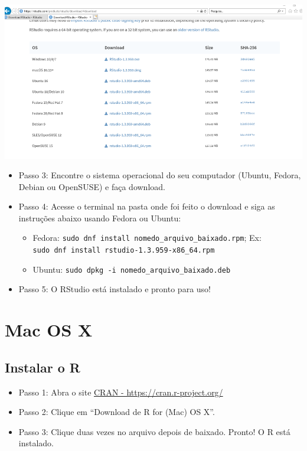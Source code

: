 \documentclass[
  10pt,
  brazil,
  a4paper,
  twoside, notitlepage, openright]{book}
\providecommand{\tightlist}{%
  \setlength{\itemsep}{0pt}\setlength{\parskip}{0pt}}
\begin{document}
\includegraphics[width=13.54in]{img/inst_1_rstudio}

\begin{itemize}
\tightlist
\item
  Passo 3: Encontre o sistema operacional do seu computador (Ubuntu, Fedora, Debian ou OpenSUSE) e faça download.\\
\item
  Passo 4: Acesse o terminal na pasta onde foi feito o download e siga as instruções abaixo usando Fedora ou Ubuntu:

  \begin{itemize}
  \tightlist
  \item
    Fedora: \texttt{sudo\ dnf\ install\ nomedo\_arquivo\_baixado.rpm}; Ex: \texttt{sudo\ dnf\ install\ rstudio-1.3.959-x86\_64.rpm}
  \item
    Ubuntu: \texttt{sudo\ dpkg\ -i\ nomedo\_arquivo\_baixado.deb}\\
  \end{itemize}
\item
  Passo 5: O RStudio está instalado e pronto para uso!
\end{itemize}

\hypertarget{mac-os-x}{%
\section{Mac OS X}\label{mac-os-x}}

\hypertarget{instalar-o-r-1}{%
\subsection{Instalar o R}\label{instalar-o-r-1}}

\begin{itemize}
\tightlist
\item
  Passo 1: Abra o site \href{https://cran.r-project.org/}{CRAN - https://cran.r-project.org/}
\item
  Passo 2: Clique em ``Download de R for (Mac) OS X''.\\
\item
  Passo 3: Clique duas vezes no arquivo depois de baixado. Pronto! O R está instalado.
\end{itemize}
\end{document}
